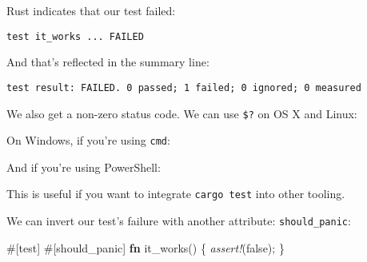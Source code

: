 \documentclass[a4paper,]{book}
\newenvironment{Shaded}{\begin{snugshade}}{\end{snugshade}}
\newcommand{\KeywordTok}[1]{\textcolor[rgb]{0.13,0.29,0.53}{\textbf{{#1}}}}
\newcommand{\ConstantTok}[1]{\textcolor[rgb]{0.00,0.00,0.00}{{#1}}}
\newcommand{\CommentTok}[1]{\textcolor[rgb]{0.56,0.35,0.01}{\textit{{#1}}}}
\newcommand{\OtherTok}[1]{\textcolor[rgb]{0.56,0.35,0.01}{{#1}}}
\newcommand{\PreprocessorTok}[1]{\textcolor[rgb]{0.56,0.35,0.01}{\textit{{#1}}}}
\newcommand{\AttributeTok}[1]{\textcolor[rgb]{0.77,0.63,0.00}{{#1}}}
\newcommand{\NormalTok}[1]{{#1}}
\begin{document}
Rust indicates that our test failed:

\begin{verbatim}
test it_works ... FAILED
\end{verbatim}

And that's reflected in the summary line:

\begin{verbatim}
test result: FAILED. 0 passed; 1 failed; 0 ignored; 0 measured
\end{verbatim}

We also get a non-zero status code. We can use \texttt{\$?} on OS X and
Linux:

\begin{Shaded}
\end{Shaded}

On Windows, if you're using \texttt{cmd}:

\begin{Shaded}
\end{Shaded}

And if you're using PowerShell:

\begin{Shaded}
\end{Shaded}

This is useful if you want to integrate \texttt{cargo\ test} into other
tooling.

We can invert our test's failure with another attribute:
\texttt{should\_panic}:

\begin{Shaded}
\begin{Highlighting}[]
\AttributeTok{#[}\NormalTok{test}\AttributeTok{]}
\AttributeTok{#[}\NormalTok{should_panic}\AttributeTok{]}
\KeywordTok{fn} \NormalTok{it_works() \{}
    \PreprocessorTok{assert!}\NormalTok{(}\ConstantTok{false}\NormalTok{);}
\NormalTok{\}}
\end{Highlighting}
\end{Shaded}
\end{document}

